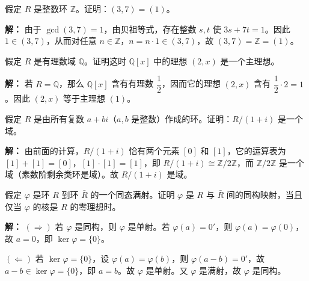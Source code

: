 \begin{example}[整数环中 $(3,7)=(1)$]
假定 $R$ 是整数环 $\mathbb{Z}$。证明：$(3,7)=(1)$。

\textbf{解：} 由于 $\gcd(3,7)=1$，由贝祖等式，存在整数 $s,t$ 使 $3s+7t=1$。因此 $1\in(3,7)$，从而对任意 $n\in\mathbb{Z}$，$n=n\cdot1\in(3,7)$，故 $(3,7)=\mathbb{Z}=(1)$。
\end{example}

\begin{example}
假定 $R$ 是有理数域 $\mathbb{Q}$。证明这时 $\mathbb{Q}[x]$ 中的理想 $(2,x)$ 是一个主理想。

\textbf{解：} 若 $R=\mathbb{Q}$，那么 $\mathbb{Q}[x]$ 含有有理数 $\dfrac{1}{2}$，因而它的理想 $(2,x)$ 含有 $\dfrac{1}{2}\cdot2=1$。因此 $(2,x)$ 等于主理想 $(1)$。
\end{example}

\begin{example}[$R/(1+i)$ 是域]
假定 $R$ 是由所有复数 $a+bi$（$a,b$ 是整数）作成的环。证明：$R/(1+i)$ 是一个域。

\textbf{解：} 由前面的计算，$R/(1+i)$ 恰有两个元素 $[0]$ 和 $[1]$，它的运算表为 $[1]+[1]=[0]$，$[1]\cdot[1]=[1]$，即 $R/(1+i)\cong\mathbb{Z}/2\mathbb{Z}$，而 $\mathbb{Z}/2\mathbb{Z}$ 是一个域（素数阶剩余类环是域）。故 $R/(1+i)$ 是域。
\end{example}

\begin{example}
假定 $\varphi$ 是环 $R$ 到环 $\bar{R}$ 的一个同态满射。证明 $\varphi$ 是 $R$ 与 $\bar{R}$ 间的同构映射，当且仅当 $\varphi$ 的核是 $R$ 的零理想时。

\textbf{解：} $(\Rightarrow)$ 若 $\varphi$ 是同构，则 $\varphi$ 是单射。若 $\varphi(a)=0'$，则 $\varphi(a)=\varphi(0)$，故 $a=0$，即 $\ker\varphi=\{0\}$。

$(\Leftarrow)$ 若 $\ker\varphi=\{0\}$，设 $\varphi(a)=\varphi(b)$，则 $\varphi(a-b)=0'$，故 $a-b\in\ker\varphi=\{0\}$，即 $a=b$。故 $\varphi$ 是单射。又 $\varphi$ 是满射，故 $\varphi$ 是同构。
\end{example}
